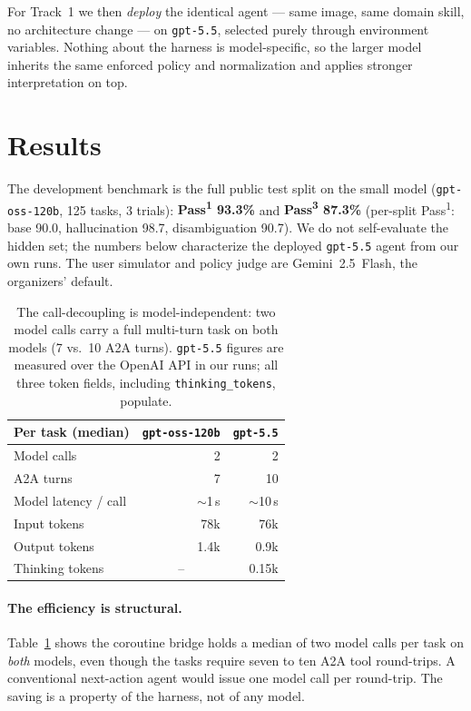 \documentclass{article}
\begin{document}
For Track~1 we then \emph{deploy} the identical agent --- same image, same domain
skill, no architecture change --- on \texttt{gpt-5.5}, selected purely through
environment variables. Nothing about the harness is model-specific, so the larger
model inherits the same enforced policy and normalization and applies stronger
interpretation on top.

\section{Results}

The development benchmark is the full public test split on the small model
(\texttt{gpt-oss-120b}, 125 tasks, 3 trials): \textbf{Pass\textsuperscript{1}
93.3\%} and \textbf{Pass\textsuperscript{3} 87.3\%} (per-split
Pass\textsuperscript{1}: base 90.0, hallucination 98.7, disambiguation 90.7). We
do not self-evaluate the hidden set; the numbers below characterize the deployed
\texttt{gpt-5.5} agent from our own runs. The user simulator and policy judge are
Gemini~2.5~Flash, the organizers' default.

\begin{table}[t]
\centering
\begin{tabular}{lrr}
\toprule
Per task (median) & \texttt{gpt-oss-120b} & \texttt{gpt-5.5} \\
\midrule
Model calls          & 2      & 2      \\
A2A turns            & 7      & 10     \\
Model latency / call & $\sim$1\,s & $\sim$10\,s \\
Input tokens         & 78k    & 76k    \\
Output tokens        & 1.4k   & 0.9k   \\
Thinking tokens      & \multicolumn{1}{c}{--} & 0.15k \\
\bottomrule
\end{tabular}
\caption{The call-decoupling is model-independent: two model calls carry a full
multi-turn task on both models (7 vs.\ 10 A2A turns). \texttt{gpt-5.5} figures are
measured over the OpenAI API in our runs; all three token fields, including
\texttt{thinking\_tokens}, populate.}
\label{tab:profile}
\end{table}

\paragraph{The efficiency is structural.}
Table~\ref{tab:profile} shows the coroutine bridge holds a median of two model
calls per task on \emph{both} models, even though the tasks require seven to ten
A2A tool round-trips. A conventional next-action agent would issue one model call
per round-trip. The saving is a property of the harness, not of any model.
\end{document}

